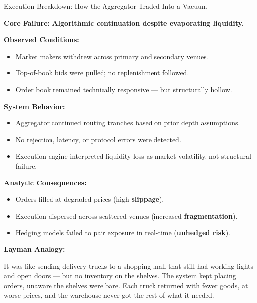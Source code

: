 \begin{TechnicalSidebar}{Execution Breakdown: How the Aggregator Traded Into a Vacuum}

  \textbf{Core Failure: Algorithmic continuation despite evaporating liquidity.}
  
  \vspace{0.5em}
  
  \textbf{Observed Conditions:}
  
  \begin{itemize}
    \item Market makers withdrew across primary and secondary venues.
    \item Top-of-book bids were pulled; no replenishment followed.
    \item Order book remained technically responsive — but structurally hollow.
  \end{itemize}
  
  \vspace{0.5em}
  
  \textbf{System Behavior:}
  
  \begin{itemize}
    \item Aggregator continued routing tranches based on prior depth assumptions.
    \item No rejection, latency, or protocol errors were detected.
    \item Execution engine interpreted liquidity loss as market volatility, not structural failure.
  \end{itemize}
  
  \vspace{0.5em}
  
  \textbf{Analytic Consequences:}
  
  \begin{itemize}
    \item Orders filled at degraded prices (high \textbf{slippage}).
    \item Execution dispersed across scattered venues (increased \textbf{fragmentation}).
    \item Hedging models failed to pair exposure in real-time (\textbf{unhedged risk}).
  \end{itemize}
  
  \vspace{0.5em}
  
  \textbf{Layman Analogy:}
  
  It was like sending delivery trucks to a shopping mall that still had working lights and open 
  doors — but no inventory on the shelves. The system kept placing orders, unaware the shelves were 
  bare. Each truck returned with fewer goods, at worse prices, and the warehouse never got the rest of what it needed.
  

\end{TechnicalSidebar}
